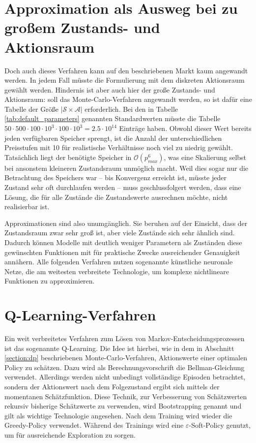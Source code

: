 \section{Approximation als Ausweg bei zu großem Zustands- und Aktionsraum}
Doch auch dieses Verfahren kann auf den beschriebenen Markt kaum angewandt werden.
In jedem Fall müsste die Formulierung mit dem diskreten Aktionsraum gewählt werden.
Hindernis ist aber auch hier der große Zustands- und Aktionsraum: soll das Monte-Carlo-Verfahren angewandt werden, so ist dafür eine Tabelle der Größe $|\mathcal{S} \times \mathcal{A}|$ erforderlich.
Bei den in Tabelle \ref{tab:default_parameters} genannten Standardwerten müsste die Tabelle $50 \cdot 500 \cdot 100 \cdot 10^3 \cdot 100 \cdot 10^3 = 2.5 \cdot 10^{14}$ Einträge haben.
Obwohl dieser Wert bereits jeden verfügbaren Speicher sprengt, ist die Anzahl der unterschiedlichen Preisstufen mit 10 für realistische Verhältnisse noch viel zu niedrig gewählt.
Tatsächlich liegt der benötigte Speicher in $\mathcal{O}\left(p_{max}^6\right)$, was eine Skalierung selbst bei ansonstem kleineren Zustandsraum unmöglich macht.
Weil dies sogar nur die Betrachtung des Speichers war -- bis Konvergenz erreicht ist, müsste jeder Zustand sehr oft durchlaufen werden -- muss geschlussfolgert werden, dass eine Lösung, die für alle Zustände die Zustandswerte ausrechnen möchte, nicht realisierbar ist.

Approximationen sind also unumgänglich.
Sie beruhen auf der Einsicht, dass der Zustandsraum zwar sehr groß ist, aber viele Zustände sich sehr ähnlich sind.
Dadurch können Modelle mit deutlich weniger Parametern als Zuständen diese gewünschten Funktionen  mit für praktische Zwecke ausreichender Genauigkeit annähern.
Alle folgenden Verfahren nutzen sogenannte künstliche neuronale Netze, die am weitesten verbreitete Technologie, um komplexe nichtlineare Funktionen zu approximieren. \cite{lapan2020deep}

\section{Q-Learning-Verfahren}
\label{section:qlearning}
Ein weit verbreitetes Verfahren zum Lösen von Markov-Entscheidungsprozessen ist das sogenannte Q-Learning.
Die Idee ist hierbei, wie in dem in Abschnitt \ref{section:dp} beschriebenen Monte-Carlo-Verfahren, Aktionswerte einer optimalen Policy zu schätzen.
Dazu wird als Berechnungsvorschrift die Bellman-Gleichung verwendet.
Allerdings werden nicht unbedingt vollständige Episoden betrachtet, sondern der Aktionswert nach dem Folgezustand ergibt sich mittels der momentanen Schätzfunktion.
Diese Technik, zur Verbesserung von Schätzwerten rekursiv bisherige Schätzwerte zu verwenden, wird Bootstrapping genannt und gilt als wichtige Technologie angesehen. \cite{Sutton1998}
Nach dem Training wird wieder die Greedy-Policy verwendet.
Während des Trainings wird eine $\varepsilon$-Soft-Policy genutzt, um für ausreichende Exploration zu sorgen.

